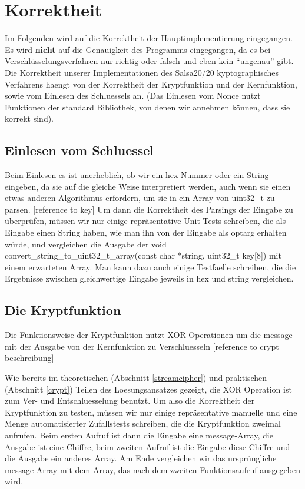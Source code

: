 \documentclass[course=erap]{aspdoc}
\begin{document}
\section{Korrektheit}
Im Folgenden wird auf die Korrektheit der Hauptimplementierung eingegangen.
Es wird \textbf{nicht} auf die Genauigkeit des Programms eingegangen, da es bei Ver\-schlüsse\-lungsverfahren
nur richtig oder falsch und eben kein ``ungenau'' gibt.
\\
Die Korrektheit unserer Implementationen des Salsa20/20 kyptographisches Verfahrens haengt von der Korrektheit der Kryptfunktion und der Kernfunktion, sowie vom Einlesen des Schluessels an. (Das Einlesen vom Nonce nutzt Funktionen der standard Bibliothek, von denen wir annehmen können, dass sie korrekt sind).

\subsection{Einlesen vom Schluessel}
Beim Einlesen es ist unerheblich, ob wir ein hex Nummer oder ein String eingeben, da sie auf die gleiche Weise interpretiert werden, auch wenn sie einen etwas anderen Algorithmus erfordern, um sie in ein Array von uint32\_t zu parsen. [reference to key]
Um dann die Korrektheit des Parsings der Eingabe zu überprüfen, müssen wir nur einige repräsentative Unit-Tests schreiben, die als Eingabe einen String haben, wie man ihn von der Eingabe als optarg erhalten würde, und vergleichen die Ausgabe der void convert\_string\_to\_uint32\_t\_array(const char *string, uint32\_t key[8]) mit einem erwarteten Array.
Man kann dazu auch einige Testfaelle schreiben, die die Ergebnisse zwischen gleichwertige Eingabe jeweils in hex und string vergleichen.


\subsection{Die Kryptfunktion}
Die Funktionsweise der Kryptfunktion nutzt XOR Operationen um die message mit der Ausgabe von der Kernfunktion zu Verschluesseln [reference to crypt beschreibung]

Wie bereits im theoretischen (Abschnitt \ref{streamcipher}) und praktischen (Abschnitt \ref{crypt}) Teilen des Loesungsansatzes gezeigt,
 die XOR Operation ist zum Ver- und Entschluesselung benutzt. 
 Um also die Korrektheit der Kryptfunktion zu testen, müssen wir nur einige repräsentative manuelle
  und eine Menge automatisierter Zufallstests schreiben, die die Kryptfunktion zweimal aufrufen.
  Beim ersten Aufruf ist dann die Eingabe eine message-Array, die Ausgabe ist eine Chiffre, 
  beim zweiten Aufruf ist die Eingabe diese Chiffre und die Ausgabe ein anderes Array. 
  Am Ende vergleichen wir das ursprüngliche message-Array mit dem Array, das nach dem zweiten 
  Funktionsaufruf ausgegeben wird.
\end{document}
